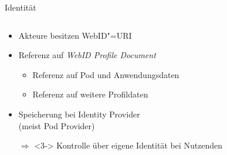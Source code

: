 \begin{frame}{Identität}
    \begin{columns}
        \begin{column}{0.55\textwidth}
            \begin{itemize}
                \item Akteure besitzen WebID"=URI~\cite{sambraSolidPlatformDecentralized2016}
                
                \item Referenz auf \emph{WebID Profile Document}~\cite{sambraSolidPlatformDecentralized2016,solidcommunitygroupSolidemblemsvg2019}
                
                \begin{itemize}
                    \item<2-> Referenz auf Pod und Anwendungsdaten~\cite{solidcommunitygroupSolidWebIDProfile2024}
                    \item<2-> Referenz auf weitere Profildaten~\cite{solidcommunitygroupSolidWebIDProfile2024}
                \end{itemize}
                
                \item<3-> Speicherung bei Identity Provider\\
                    (meist Pod Provider)~\cite{sambraSolidPlatformDecentralized2016}
                \item[$\Rightarrow$]<3-> Kontrolle über eigene Identität bei Nutzenden~\cite{sambraSolidPlatformDecentralized2016}
            \end{itemize}
        \end{column}

        \begin{column}{0.45\textwidth}
        \end{column}
    \end{columns}
\end{frame}


